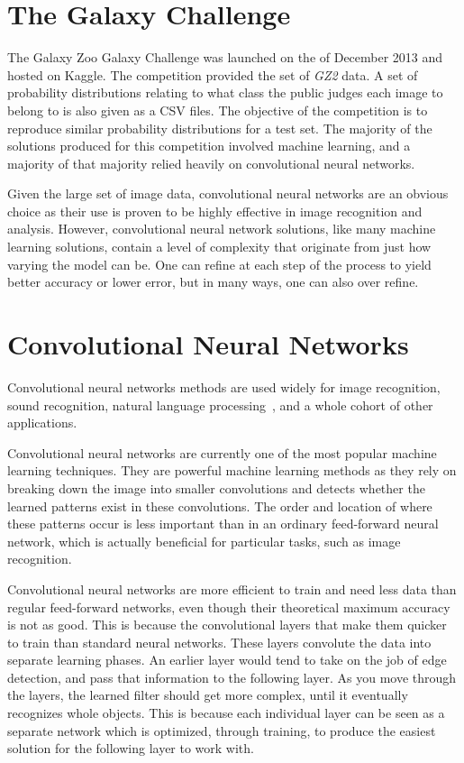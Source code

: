 \documentclass[12pt,a4paper,oneside,oldfontcommands]{memoir}
\begin{document}
\section{The Galaxy Challenge}

The Galaxy Zoo Galaxy Challenge was launched on the  of December 2013 and hosted on Kaggle. The competition provided the set of \textit{GZ2} data. A set of probability distributions relating to what class the public judges each image to belong to is also given as a CSV files. The objective of the competition is to reproduce similar probability distributions for a test set. The majority of the solutions produced for this competition involved machine learning, and a majority of that majority relied heavily on convolutional neural networks.

Given the large set of image data, convolutional neural networks are an obvious choice as their use is proven to be highly effective in image recognition and analysis. However, convolutional neural network solutions, like many machine learning solutions, contain a level of complexity that originate from just how varying the model can be. One can refine at each step of the process to yield better accuracy or lower error, but in many ways, one can also over refine.

\section{Convolutional Neural Networks}

Convolutional neural networks methods are used widely for image recognition, sound recognition, natural language processing~\cite{Bhandare}, and a whole cohort of other applications.

Convolutional neural networks are currently one of the most popular machine learning techniques. They are powerful machine learning methods as they rely on breaking down the image into smaller convolutions and detects whether the learned patterns exist in these convolutions. The order and location of where these patterns occur is less important than in an ordinary feed-forward neural network, which is actually beneficial for particular tasks, such as image recognition.

Convolutional neural networks are more efficient to train and need less data than regular feed-forward networks, even though their theoretical maximum accuracy is not as good. This is because the convolutional layers that make them quicker to train than standard neural networks. These layers convolute the data into separate learning phases. An earlier layer would tend to take on the job of edge detection, and pass that information to the following layer. As you move through the layers, the learned filter should get more complex, until it eventually recognizes whole objects. This is because each individual layer can be seen as a separate network which is optimized, through training, to produce the easiest solution for the following layer to work with. 
\end{document}

